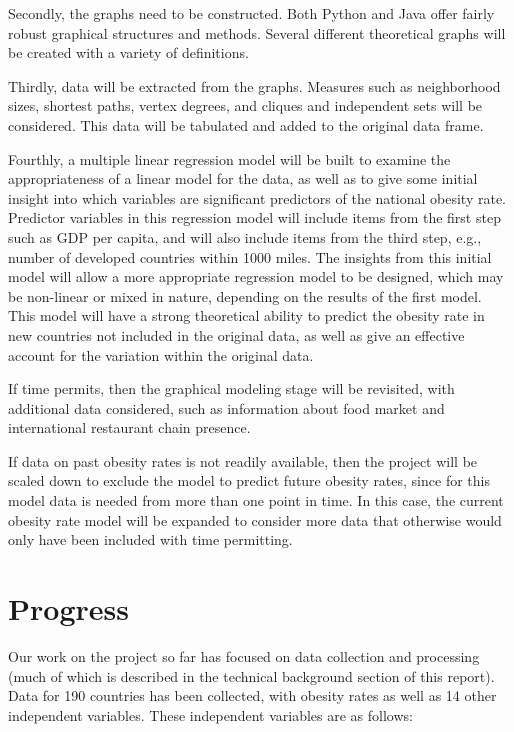 \documentclass[oneside,12pt]{report}
\begin{document}
Secondly, the graphs need to be constructed. Both Python and Java offer fairly robust graphical structures and methods. Several different theoretical graphs will be created with a variety of definitions.

Thirdly, data will be extracted from the graphs. Measures such as neighborhood sizes, shortest paths, vertex degrees, and cliques and independent sets will be considered. This data will be tabulated and added to the original data frame.

Fourthly, a multiple linear regression model will be built to examine the appropriateness of a linear model for the data, as well as to give some initial insight into which variables are significant predictors of the national obesity rate. Predictor variables in this regression model will include items from the first step such as GDP per capita, and will also include items from the third step, e.g., number of developed countries within 1000 miles. The insights from this initial model will allow a more appropriate regression model to be designed, which may be non-linear or mixed in nature, depending on the results of the first model. This model will have a strong theoretical ability to predict the obesity rate in new countries not included in the original data, as well as give an effective account for the variation within the original data.

If time permits, then the graphical modeling stage will be revisited, with additional data considered, such as information about food market and international restaurant chain presence.

If data on past obesity rates is not readily available, then the project will be scaled down to exclude the model to predict future obesity rates, since for this model data is needed from more than one point in time. In this case, the current obesity rate model will be expanded to consider more data that otherwise would only have been included with time permitting.

\chapter{Progress}

Our work on the project so far has focused on data collection and processing (much of which is described in the technical background section of this report). Data for 190 countries has been collected, with obesity rates as well as 14 other independent variables. These independent variables are as follows:
\end{document}
